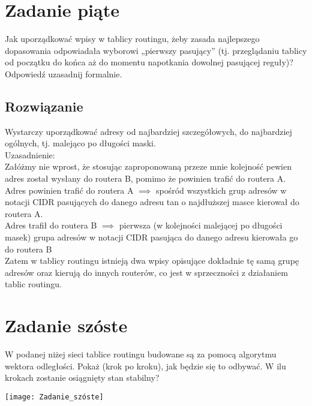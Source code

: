 \documentclass[a4paper]{article}
\begin{document}
\section{Zadanie piąte}
Jak uporządkować wpisy w tablicy routingu, żeby zasada najlepszego dopasowania odpowiadała wyborowi „pierwszy pasujący” (tj. przeglądaniu tablicy od początku do końca aż do momentu napotkania dowolnej pasującej reguły)? Odpowiedź uzasadnij formalnie.

\subsection{Rozwiązanie}
Wystarczy uporządkować adresy od najbardziej szczegółowych, do najbardziej ogólnych, tj. malejąco po długości maski.\\

Uzasadnienie:\\
Załóżmy nie wprost, że stosując zaproponowaną przeze mnie kolejność pewien adres został wysłany do routera B, pomimo że powinien trafić do routera A.  \\

Adres powinien trafić do routera A $\implies$ spośród wszystkich grup adresów w notacji CIDR pasujących do danego adresu tan o najdłuższej masce kierował do routera A.\\

Adres trafił do routera B $\implies$ pierwsza (w kolejności malejącej po długości masek) grupa adresów w notacji CIDR pasująca do danego adresu kierowała go do routera B\\

Zatem w tablicy routingu istnieją dwa wpisy opisujące dokładnie tę samą grupę adresów oraz kierują do innych routerów, co jest w sprzeczności z działaniem tablic routingu.


\section{Zadanie szóste}
W podanej niżej sieci tablice routingu budowane są za pomocą algorytmu wektora odległości. Pokaż (krok po kroku), jak będzie się to odbywać. W ilu krokach zostanie osiągnięty stan stabilny?

\texttt{[image: Zadanie\_szóste]}
\end{document}
